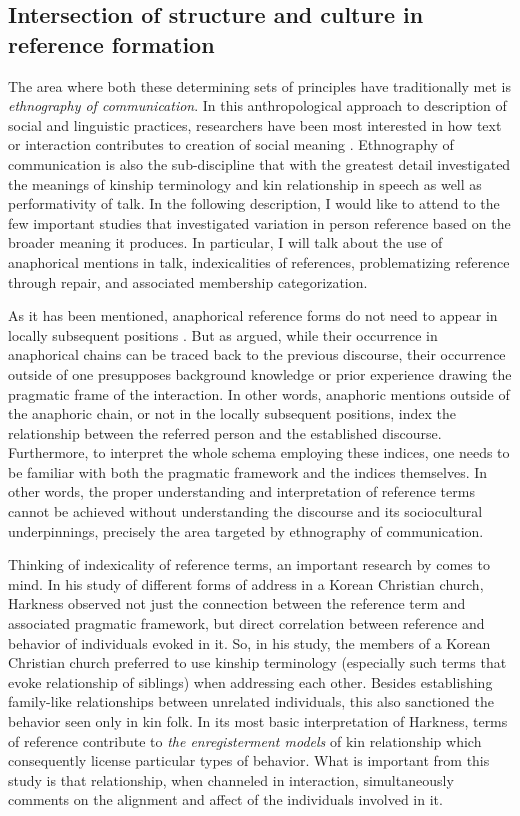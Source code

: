 \documentclass[12pt, draft]{article}
\begin{document}
\subsection{Intersection of structure and culture in reference formation}
The area where both these determining sets of principles have traditionally met is \textit{ethnography of communication}. In this anthropological approach to description of social and linguistic practices, researchers have been most interested in how text or interaction contributes to creation of social meaning \parencite{hymes1989}. Ethnography of communication is also the sub-discipline that with the greatest detail investigated the meanings of kinship terminology and kin relationship in speech as well as performativity of talk. In the following description, I would like to attend to the few important studies that investigated variation in person reference based on the broader meaning it produces. In particular, I will talk about the use of anaphorical mentions in talk, indexicalities of references, problematizing reference through repair, and associated membership categorization. 

As it has been mentioned, anaphorical reference forms do not need to appear in locally subsequent positions \parencite{schegloff1996}. But as \textcite{hanks2007} argued, while their occurrence in anaphorical chains can be traced back to the previous discourse, their occurrence outside of one presupposes background knowledge or prior experience drawing the pragmatic frame of the interaction. In other words, anaphoric mentions outside of the anaphoric chain, or not in the locally subsequent positions, index the relationship between the referred person and the established discourse. Furthermore, to interpret the whole schema employing these indices, one needs to be familiar with both the pragmatic framework and the indices themselves. In other words, the proper understanding and interpretation of reference terms cannot be achieved without understanding the discourse and its sociocultural underpinnings, precisely the area targeted by ethnography of communication.

Thinking of indexicality of reference terms, an important research by \textcite{harkness2015} comes to mind. In his study of different forms of address in a Korean Christian church, Harkness observed not just the connection between the reference term and associated pragmatic framework, but direct correlation between reference and behavior of individuals evoked in it. So, in his study, the members of a Korean Christian church preferred to use kinship terminology (especially such terms that evoke relationship of siblings) when addressing each other. Besides establishing family-like relationships between unrelated individuals, this also sanctioned the behavior seen only in kin folk. In its most basic interpretation of Harkness, terms of reference contribute to \textit{the enregisterment models} of kin relationship which consequently license particular types of behavior. What is important from this study is that relationship, when channeled in interaction, simultaneously comments on the alignment and affect of the individuals involved in it. 
\end{document}
